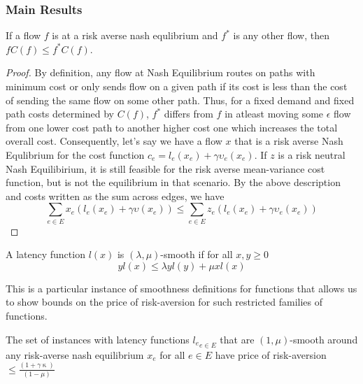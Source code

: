 \subsubsection{Main Results}
\begin{theorem}
    If a flow $f$ is at a risk averse nash equlibrium and $f^*$ is any other flow, then $fC(f)\leq f^*C(f)$. 
    \label{variational}
\end{theorem}

\begin{proof}
    By definition, any flow at Nash Equilibrium routes on paths with minimum cost or only sends flow on a given path if its cost is less than
    the cost of sending the same flow on some other path. Thus, for a fixed demand and fixed path costs determined by $C(f)$, $f^*$ differs from $f$ in 
    atleast moving some $\epsilon$ flow from one lower cost path to another higher cost one which increases the total overall cost. 
    Consequently, let's say we have a flow $x$ that is a risk averse Nash Equlibrium 
    for the cost function $c_e = l_e(x_e) +\gamma \upsilon_e(x_e)$. If $z$ is a risk neutral Nash Equilibirium, it is still feasible for the risk averse
    mean-variance cost function, but is not the equilibrium in that scenario. By the above description and costs written as the sum across edges, we have
    $$\sum_{e \in E}x_e(l_e(x_e) + \gamma \upsilon(x_e)) \leq \sum_{e \in E} z_e(l_e(x_e) + \gamma \upsilon_e(x_e))$$
\end{proof}

\begin{definition}
    A latency function $l(x)$ is $(\lambda, \mu)$-smooth if for all $x, y \geq 0$ $$ yl(x) \leq \lambda yl(y) + \mu x l(x)$$
    
    This is a particular instance of smoothness definitions for functions that allows us to show bounds on the price of risk-aversion for such restricted families of functions. 
\end{definition}

\begin{theorem}
    The set of instances with latency functions ${l_e}_{e \in E}$ that are $(1,\mu)$-smooth around any risk-averse nash equilibrium $x_e$ for all $e \in E$ have price of risk-aversion
    $\leq \displaystyle \frac{(1 + \gamma \upkappa)}{(1 - \mu)}$
\end{theorem}


